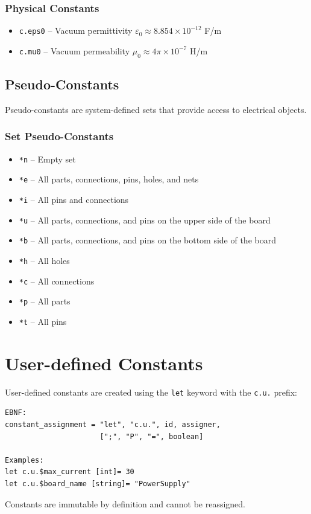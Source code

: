 \documentclass{report}
\begin{document}
\subsubsection{Physical Constants}
\begin{itemize}
\item \texttt{c.eps0} -- Vacuum permittivity $\varepsilon_0 \approx 8.854 \times 10^{-12}$ F/m
\item \texttt{c.mu0} -- Vacuum permeability $\mu_0 \approx 4\pi \times 10^{-7}$ H/m
\end{itemize}

\subsection{Pseudo-Constants}
Pseudo-constants are system-defined sets that provide access to electrical objects.

\subsubsection{Set Pseudo-Constants}
\begin{itemize}
\item \texttt{*n} -- Empty set
\item \texttt{*e} -- All parts, connections, pins, holes, and nets
\item \texttt{*i} -- All pins and connections
\item \texttt{*u} -- All parts, connections, and pins on the upper side of the board
\item \texttt{*b} -- All parts, connections, and pins on the bottom side of the board
\item \texttt{*h} -- All holes
\item \texttt{*c} -- All connections
\item \texttt{*p} -- All parts
\item \texttt{*t} -- All pins
\end{itemize}

\section{User-defined Constants}
User-defined constants are created using the \texttt{let} keyword with the \texttt{c.u.} prefix:
\begin{verbatim}
EBNF:
constant_assignment = "let", "c.u.", id, assigner, 
                      [";", "P", "=", boolean]

Examples:
let c.u.$max_current [int]= 30
let c.u.$board_name [string]= "PowerSupply"
\end{verbatim}
Constants are immutable by definition and cannot be reassigned.
\end{document}
